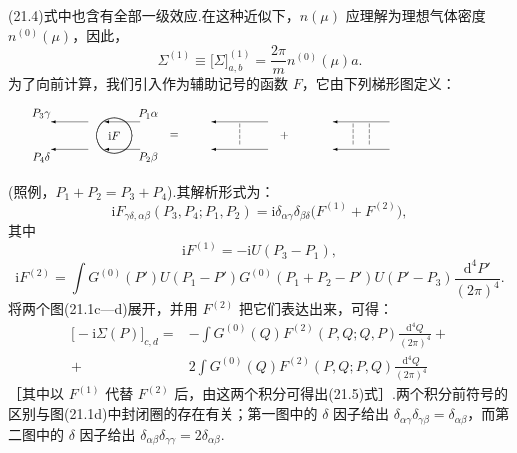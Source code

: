 (21.4)式中也含有全部一级效应.在这种近似下，$n(\mu)$ 应理解为理想气体密度 $n^{(0)}(\mu)$，因此，
\begin{equation}
  \Sigma^{(1)}\equiv\bigl[\Sigma\bigr]^{(1)}_{a,b}=\frac{2\pi}{m}n^{(0)}(\mu)a.
\end{equation}
为了向前计算，我们引入作为辅助记号的函数 $F$，它由下列梯形图定义：
\begin{equation}
  \setlength{\unitlength}{0.72pt}%
  \begin{picture}(620,80)(0,0)
    \arrL{98}{56}{46}%
    \arrL{162}{56}{44}%
    \arrL{98}{22}{46}%
    \arrL{162}{22}{44}%
    \put(40,66){\makebox(0,0){$P_3\gamma$}}%
    \put(172,66){\makebox(0,0){$P_1\alpha$}}%
    \put(40,12){\makebox(0,0){$P_4\delta$}}%
    \put(172,12){\makebox(0,0){$P_2\beta$}}%
    \qbezier(130,17)(150.108,18.892)(152,39)%
    \qbezier(152,39)(150.108,59.108)(130,61)%
    \qbezier(130,61)(109.892,59.108)(108,39)%
    \qbezier(108,39)(109.892,18.892)(130,17)%
    \put(130,39){\makebox(0,0){$\mathrm{i}F$}}%
    \put(204,39){\makebox(0,0){$=$}}%
    \arrL{320}{56}{70}%
    \arrL{320}{22}{70}%
    \dvh{285}{28}{4}%
    \put(340,39){\makebox(0,0){$+$}}%
    \arrL{470}{56}{70}%
    \arrL{470}{22}{70}%
    \dvh{425}{28}{4}%
    \dvh{445}{28}{4}%
  \end{picture}
\end{equation}
(照例，$P_1+P_2=P_3+P_4$).其解析形式为：
\begin{equation}
  \mathrm{i}F_{\gamma\delta,\alpha\beta}(P_3,P_4;P_1,P_2)=\mathrm{i}\delta_{\alpha\gamma}\delta_{\beta\delta}\bigl(F^{(1)}+F^{(2)}\bigr),
\end{equation}
其中
\begin{equation}
  \mathrm{i}F^{(1)}=-\mathrm{i}U(P_3-P_1),
\end{equation}
\begin{equation}
  \mathrm{i}F^{(2)}=\int G^{(0)}(P')U(P_1-P')G^{(0)}(P_1+P_2-P')U(P'-P_3)\frac{\mathrm{d}^4P'}{(2\pi)^4}.
\end{equation}
将两个图(21.1c—d)展开，并用 $F^{(2)}$ 把它们表达出来，可得：
\begin{equation}
\begin{aligned}
  \bigl[-\mathrm{i}\Sigma(P)\bigr]_{c,d}={}&-\int G^{(0)}(Q)F^{(2)}(P,Q;Q,P)\frac{\mathrm{d}^4Q}{(2\pi)^4}+\\
  +{}&2\int G^{(0)}(Q)F^{(2)}(P,Q;P,Q)\frac{\mathrm{d}^4Q}{(2\pi)^4}
\end{aligned}
\end{equation}
［其中以 $F^{(1)}$ 代替 $F^{(2)}$ 后，由这两个积分可得出(21.5)式］.两个积分前符号的区别与图(21.1d)中封闭圈的存在有关；第一图中的 $\delta$ 因子给出 $\delta_{\alpha\gamma}\delta_{\gamma\beta}=\delta_{\alpha\beta}$，而第二图中的 $\delta$ 因子给出 $\delta_{\alpha\beta}\delta_{\gamma\gamma}=2\delta_{\alpha\beta}$.

